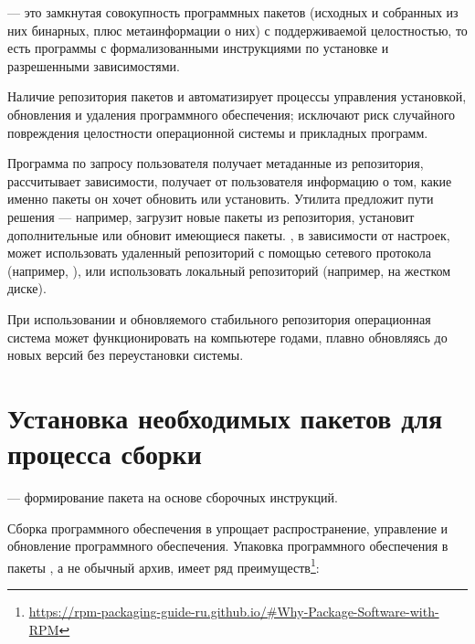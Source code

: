  --- это замкнутая совокупность программных пакетов (исходных и 
собранных из них бинарных, плюс метаинформации о них) с поддерживаемой целостностью, то есть программы с 
формализованными инструкциями по установке и разрешенными зависимостями.

Наличие репозитория пакетов и  автоматизирует процессы управления установкой, обновления и удаления 
программного обеспечения; исключают риск случайного повреждения целостности операционной системы и прикладных 
программ.

Программа  по запросу пользователя получает метаданные из репозитория, рассчитывает зависимости, 
получает от пользователя информацию о том, какие именно пакеты он хочет обновить или установить. Утилита 
предложит пути решения --- например, загрузит новые пакеты из репозитория, установит дополнительные или 
обновит имеющиеся пакеты. , в зависимости от настроек, может использовать удаленный репозиторий 
с помощью сетевого протокола (например, ), или использовать локальный репозиторий (например, 
на жестком диске).


При использовании  и обновляемого стабильного репозитория операционная система может 
функционировать на компьютере годами, плавно обновляясь до новых версий без переустановки системы. 

\section{Установка необходимых пакетов для процесса сборки}
 --- формирование пакета на основе сборочных инструкций.

Сборка программного обеспечения в  упрощает распространение, управление и обновление программного 
обеспечения. Упаковка программного обеспечения в пакеты , а не обычный архив, имеет ряд 
преимуществ\footnote{\href{https://rpm-packaging-guide-ru.github.io/\#Why-Package-Software-with-RPM}
{https://rpm-packaging-guide-ru.github.io/\#Why-Package-Software-with-RPM}}:

